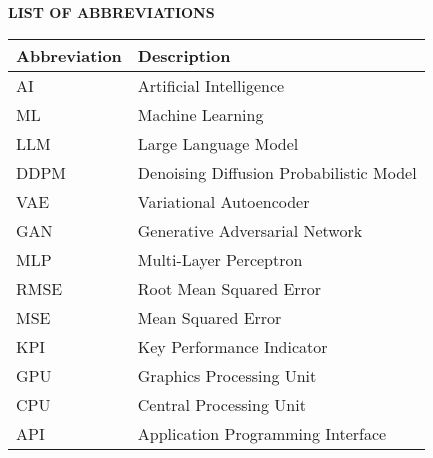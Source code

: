 \newpage



\begin{center}
  \Large\textbf{LIST OF ABBREVIATIONS}
\end{center}

\vspace{0.5cm}


\normalsize
\begin{center}
  \renewcommand{\arraystretch}{1.5} %
  \begin{tabular}{|p{3cm}|p{8cm}|}  %
    \hline %
    \textbf{Abbreviation} & \textbf{Description} \\
    \hline %
    AI & Artificial Intelligence \\
    \hline %
    ML & Machine Learning \\
    \hline %
    LLM & Large Language Model \\
    \hline %
    DDPM & Denoising Diffusion Probabilistic Model \\
    \hline %
    VAE & Variational Autoencoder \\
    \hline %
    GAN & Generative Adversarial Network \\
    \hline %
    MLP & Multi-Layer Perceptron \\
    \hline %
    RMSE & Root Mean Squared Error \\
    \hline %
    MSE & Mean Squared Error \\
    \hline %
    KPI & Key Performance Indicator \\
    \hline %
    GPU & Graphics Processing Unit \\
    \hline %
    CPU & Central Processing Unit \\
    \hline %
    API & Application Programming Interface \\
    \hline %
  \end{tabular}
\end{center}
